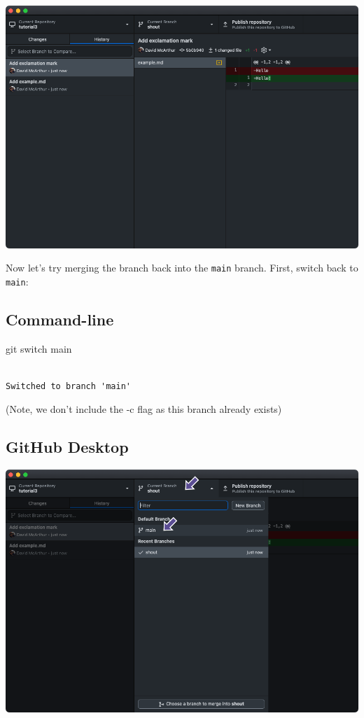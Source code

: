 \documentclass[
  letterpaper,
  DIV=11,
  numbers=noendperiod]{scrartcl}
\newenvironment{Shaded}{\begin{snugshade}}{\end{snugshade}}
\newcommand{\ControlFlowTok}[1]{\textcolor[rgb]{0.00,0.23,0.31}{#1}}
\newcommand{\NormalTok}[1]{\textcolor[rgb]{0.00,0.23,0.31}{#1}}
\begin{document}
\includegraphics{images/image31.png}

Now let's try merging the branch back into the \texttt{main} branch.
First, switch back to \texttt{main}:

\subsection{Command-line}

\begin{Shaded}
\begin{Highlighting}[]
\NormalTok{git }\ControlFlowTok{switch}\NormalTok{ main}
\end{Highlighting}
\end{Shaded}

\begin{verbatim}

Switched to branch 'main'
\end{verbatim}

(Note, we don't include the -c flag as this branch already exists)

\subsection{GitHub Desktop}

\includegraphics{images/image32.png}
\end{document}
